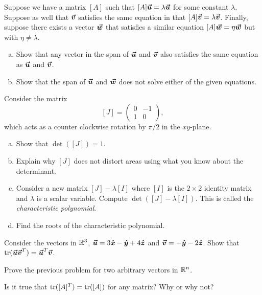 \documentclass[12pt]{article} %
\begin{document}
\begin{problem}
Suppose we have a matrix $[A]$ such that $[A]\boldsymbol{\boldsymbol{\vec{u}}} = \lambda \boldsymbol{\boldsymbol{\vec{u}}}$ for some constant $\lambda$.  Suppose as well that $\boldsymbol{\boldsymbol{\vec{v}}}$ satisfies the same equation in that $[A]\boldsymbol{\boldsymbol{\vec{v}}} = \lambda \boldsymbol{\boldsymbol{\vec{v}}}$.  Finally, suppose there exists a vector $\boldsymbol{\boldsymbol{\vec{w}}}$ that satisfies a similar equation $[A]\boldsymbol{\boldsymbol{\vec{w}}} = \eta \boldsymbol{\boldsymbol{\vec{w}}}$ but with $\eta\neq \lambda$.
\begin{enumerate}[(a)]
    \item Show that any vector in the span of $\boldsymbol{\boldsymbol{\vec{u}}}$ and $\boldsymbol{\boldsymbol{\vec{v}}}$ also satisfies the same equation as $\boldsymbol{\boldsymbol{\vec{u}}}$ and $\boldsymbol{\boldsymbol{\vec{v}}}$.
    \item Show that the span of $\boldsymbol{\boldsymbol{\vec{u}}}$ and $\boldsymbol{\boldsymbol{\vec{w}}}$ does not solve either of the given equations.
\end{enumerate}
\end{problem}

\begin{problem}
Consider the matrix 
\[
[J] = \begin{pmatrix} 0 & -1 \\ 1 & 0 \end{pmatrix},
\]
which acts as a counter clockwise rotation by $\pi/2$ in the $xy$-plane.  
\begin{enumerate}[(a)]
    \item Show that $\det([J])=1$.
    \item Explain why $[J]$ does not distort areas using what you know about the determinant.
    \item Consider a new matrix $[J]-\lambda [I]$ where $[I]$ is the $2\times 2$ identity matrix and $\lambda$ is a scalar variable.  Compute $\det([J]-\lambda [I])$. This is called the \emph{characteristic polynomial}.
    \item Find the roots of the characteristic polynomial.
\end{enumerate}
\end{problem}

\begin{problem}
Consider the vectors in $\mathbb{R}^3$, $\boldsymbol{\boldsymbol{\vec{u}}}=3\boldsymbol{\hat{x}} - \boldsymbol{\hat{y}} + 4\boldsymbol{\hat{z}}$ and $\boldsymbol{\boldsymbol{\vec{v}}}=-\boldsymbol{\hat{y}} - 2\boldsymbol{\hat{z}}$.  Show that $\mathrm{tr}(\boldsymbol{\boldsymbol{\vec{u}}} \boldsymbol{\boldsymbol{\vec{v}}}^T) = \boldsymbol{\boldsymbol{\vec{u}}}^T \boldsymbol{\boldsymbol{\vec{v}}}$.
\end{problem}

\begin{problem}
Prove the previous problem for two arbitrary vectors in $\mathbb{R}^n$.
\end{problem}

\begin{problem}
Is it true that $\mathrm{tr}([A]^T)=\mathrm{tr}([A])$ for any matrix? Why or why not?
\end{problem}
\end{document}
